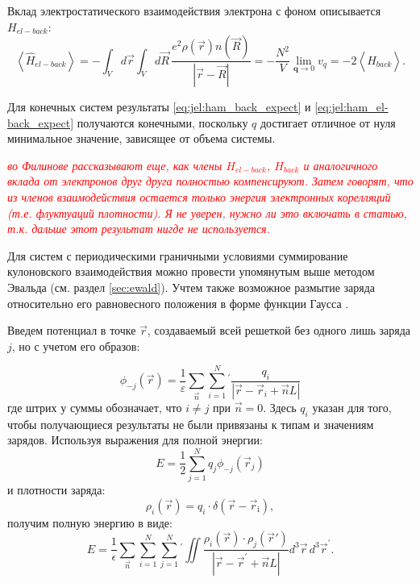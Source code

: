 Вклад электростатического взаимодействия электрона с фоном описывается $H_{el-back}$:
\begin{equation}
    \label{eq:jel:ham_el-back_expect}
    \left\langle\hat{H}_{e l-b a c k}\right\rangle
    = -\int_{V} d \vec{r} \int_{V} d \vec{R}\, \frac{e^{2} \rho(\vec{r}) n(\vec{R})}{|\vec{r}-\vec{R}|}
    = -\frac{N^{2}}{V} \lim _{\mathbf{q} \rightarrow 0} v_{q}
    = -2 \left\langle\hat{H}_{b a c k}\right\rangle.
\end{equation}

Для конечных систем результаты \eqref{eq:jel:ham_back_expect} и \eqref{eq:jel:ham_el-back_expect} получаются конечными, поскольку $q$ достигает отличное от нуля минимальное значение, зависящее от объема системы.

\textcolor{red}{\textit{
    во Филинове рассказывают еще, как члены $H_{el-back}$, $H_{back}$ и аналогичного вклада от электронов друг друга полностью компенсируют.
    Затем говорят, что из членов взаимодействия остается только энергия электронных корелляций (т.е. флуктуаций плотности).
    Я не уверен, нужно ли это включать в статью, т.к. дальше этот результат нигде не используется. 
}}

Для систем с периодическими граничными условиями суммирование кулоновского взаимодействия можно провести упомянутым выше методом Эвальда (см. раздел \ref{sec:ewald}).
Учтем также возможное размытие заряда относительно его равновесного положения в форме функции Гаусса \cite{jel:blinov}.

Введем потенциал в точке $\vec{r}$, создаваемый всей решеткой без одного лишь заряда $j$, но с учетом его образов:

\begin{equation}
    \label{eq:jel:phi_no_j}
    \phi_{-j}(\vec{r})=\frac{1}{\varepsilon} \sum_{\vec{n}} \sum_{i=1}^{N} {}^\prime \frac{q_{i}}{\left|\vec{r}-\vec{r}_{i}+\vec{n} L\right|}
\end{equation}
где штрих у суммы обозначает, что $i \neq j$ при $\vec{n} = 0$.
Здесь $q_i$ указан для того, чтобы получающиеся результаты не были привязаны к типам и значениям зарядов.
Используя выражения для полной энергии:
\begin{equation}
    \label{eq:jel:coloumb_energy}
    E = \frac{1}{2} \sum_{j=1}^{N} q_{j} \phi_{-j}\left(\vec{r}_j\right)
\end{equation}
и плотности заряда:
\begin{equation}
    \rho_{i}(\vec{r})=q_{i} \cdot \delta\left(\vec{r}-\vec{r}_{\mathrm{i}}\right),
\end{equation}
получим полную энергию в виде:
\begin{equation}
    \label{eq:jel:ewald_E_coloumb_total}
    E = \frac{1}{\epsilon} \sum_{\vec{n}} \sum_{i=1}^{N} \sum_{j=1}^{N} {}^\prime \iint \frac{\rho_{i}(\vec{r}) \cdot
    \rho_{j}\left(\vec{r}'\right)}{\left|\vec{r}-\vec{r}^{\prime}+\vec{n} L\right|} d^3 \vec{r}\, d^3 \vec{r}^{\prime}.
\end{equation}

